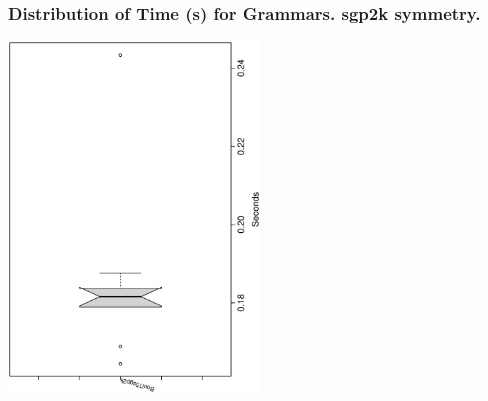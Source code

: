  \begin{frame}
 \frametitle{ Distribution of Time (s) for Grammars. sgp2k  symmetry. }
 \begin{center}
\includegraphics[width=0.5\textwidth, angle=-90]
{ExpFboxplottSeconds000.eps}
 \end{center}
 \label{ExpFboxplottSeconds000.eps}  
 \end{frame}

